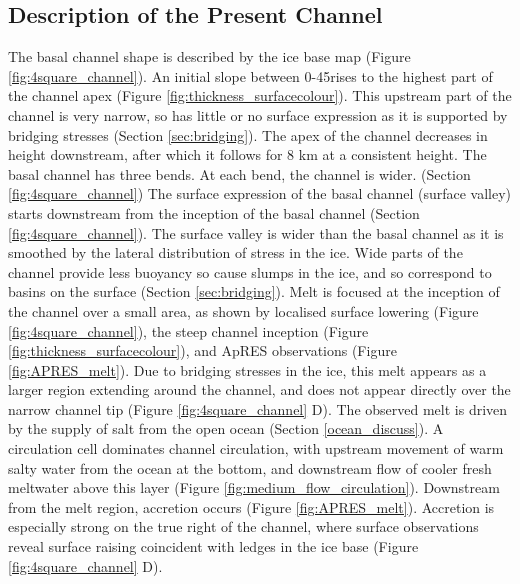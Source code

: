 \subsection{Description of the Present Channel}
The basal channel shape is described by the ice base map (Figure \ref{fig:4square_channel}). An initial slope between 0-45\textdegree rises to the highest part of the channel apex (Figure \ref{fig:thickness_surfacecolour}). This upstream part of the channel is very narrow, so has little or no surface expression as it is supported by bridging stresses (Section \ref{sec:bridging}). The apex of the channel decreases in height downstream, after which it follows for 8 km at a consistent height.
The basal channel has three bends. At each bend, the channel is wider. (Section \ref{fig:4square_channel}) 
The surface expression of the basal channel (surface valley) starts downstream from the inception of the basal channel (Section \ref{fig:4square_channel}). The surface valley is wider than the basal channel as it is smoothed by the lateral distribution of stress in the ice. Wide parts of the channel provide less buoyancy so cause slumps in the ice, and so correspond to basins on the surface (Section \ref{sec:bridging}).
Melt is focused at the inception of the channel over a small area, as shown by localised surface lowering (Figure \ref{fig:4square_channel}), the steep channel inception (Figure \ref{fig:thickness_surfacecolour}), and ApRES observations (Figure \ref{fig:APRES_melt}). Due to bridging stresses in the ice, this melt appears as a larger region extending around the channel, and does not appear directly over the narrow channel tip  (Figure \ref{fig:4square_channel} D). 
The observed melt is driven by the supply of salt from the open ocean (Section \ref{ocean_discuss}). A circulation cell dominates channel circulation, with upstream movement of warm salty water from the ocean at the bottom, and downstream flow of cooler fresh meltwater above this layer (Figure \ref{fig:medium_flow_circulation}). 
Downstream from the melt region, accretion occurs (Figure \ref{fig:APRES_melt}).
Accretion is especially strong on the true right of the channel, where surface observations reveal surface raising coincident with ledges in the ice base (Figure \ref{fig:4square_channel} D). 


